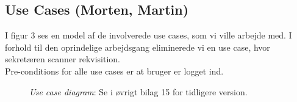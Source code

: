 \subsection*{Use Cases (Morten, Martin)}
I figur 3 ses en model af de involverede use cases, som vi ville arbejde med. I
forhold til den oprindelige arbejdsgang eliminerede vi en use case, hvor
sekretæren scanner rekvisition.\\
\indent Pre-conditions for alle use cases er at bruger er logget ind.
\FloatBarrier
\begin{figure}[h]
\centering
{}
\caption{\emph{Use case diagram}: Se i øvrigt bilag 15 for tidligere version.
\label{use_case_diagram}}
\end{figure}
\FloatBarrier
